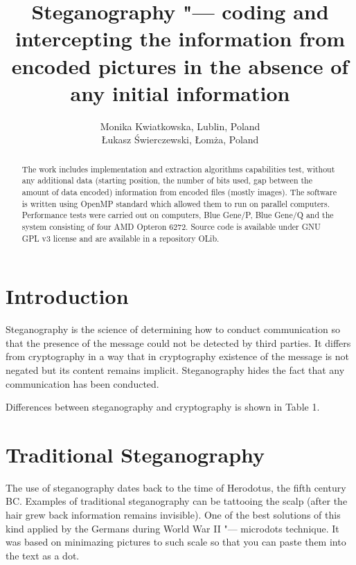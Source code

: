 \documentclass[10pt, a5paper]{article}
\begin{document}
\title{Steganography "--- coding and intercepting the information from encoded pictures in the absence of any initial information}
\author{Monika Kwiatkowska, Lublin, Poland \\ \L{}ukasz \'S{}wierczewski, \L{}om\.z{}a, Poland}
\maketitle
\begin{abstract}
The work includes implementation and extraction algorithms capabilities test, without any additional data (starting position, the number of bits used, gap between the amount of data encoded) information from encoded files (mostly images). The software is written using OpenMP standard which allowed them to run on parallel computers. Performance tests were carried out on computers, Blue Gene/P, Blue Gene/Q and the system consisting of four AMD Opteron 6272. Source code is available under GNU GPL v3 license and are available in a repository OLib.
\end{abstract}
\section{Introduction}

Steganography is the science of determining how to conduct commu\-ni\-ca\-tion so that the presence of the message could not be detected by third parties. It differs from cryptography in a way that in cryptography existence of the message is not negated but its content remains implicit. Steganography hides the fact that any communication has been con\-duct\-ed.

Differences between steganography and cryptography is shown in Table 1.

\section{Traditional Steganography}
The use of steganography dates back to the time of Herodotus, the fifth century BC. Examples of traditional steganography can be tattooing the scalp (after the hair grew back information remains in\-vi\-sible). One of the best solutions of this kind applied by the Germans during World War II "--- microdots technique. It was based on minimazing  pictures to such scale so that you can paste them into the text as a dot.
\end{document}
